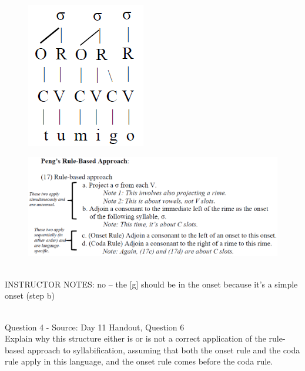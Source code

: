 \documentclass[12pt]{article}
\begin{document}
\begin{figure}[H]
\includegraphics{../images/pengrules_tumigo_no.png}
\end{figure}
\begin{figure}[H]
\includegraphics{../images/peng_rules.png}
\end{figure}

~\\
INSTRUCTOR NOTES: no -- the [g] should be in the onset because it's a simple onset (step b)


~\\

{\large Question 4} - Source: Day 11 Handout, Question 6\\

Explain why this structure either is or is not a correct application of the rule-based approach to syllabification, assuming that both the onset rule and the coda rule apply in this language, and the onset rule comes before the coda rule.\\
\end{document}
